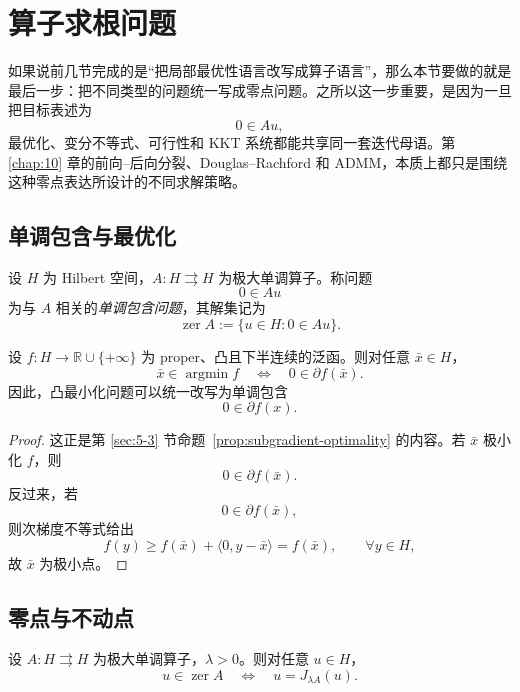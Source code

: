 \section{算子求根问题}

\label{sec:9-4}

如果说前几节完成的是“把局部最优性语言改写成算子语言”，那么本节要做的就是最后一步：把不同类型的问题统一写成零点问题。之所以这一步重要，是因为一旦把目标表述为
\[
0\in Au,
\]
最优化、变分不等式、可行性和 KKT 系统都能共享同一套迭代母语。第 \ref{chap:10} 章的前向--后向分裂、Douglas--Rachford 和 ADMM，本质上都只是围绕这种零点表达所设计的不同求解策略。

\subsection{单调包含与最优化}

\begin{definition}[单调包含问题]\label{def:monotone-inclusion-problem}
设 $H$ 为 Hilbert 空间，$A\colon H\rightrightarrows H$ 为极大单调算子。称问题
\[
0\in Au
\]
为与 $A$ 相关的\emph{单调包含问题}，其解集记为
\[
\operatorname{zer} A:=\{u\in H:0\in Au\}.
\]
\end{definition}

\begin{proposition}[最优化问题是单调包含的特例]\label{prop:optimization-as-monotone-inclusion}
设 $f\colon H\to \mathbb R\cup\{+\infty\}$ 为 proper、凸且下半连续的泛函。则对任意 $\bar x\in H$，
\[
\bar x\in \operatorname*{argmin} f
\quad\Longleftrightarrow\quad
0\in \partial f(\bar x).
\]
因此，凸最小化问题可以统一改写为单调包含
\[
0\in \partial f(x).
\]
\end{proposition}

\begin{proof}
这正是第 \ref{sec:5-3} 节命题~\ref{prop:subgradient-optimality} 的内容。若 $\bar x$ 极小化 $f$，则
\[
0\in \partial f(\bar x).
\]
反过来，若
\[
0\in \partial f(\bar x),
\]
则次梯度不等式给出
\[
f(y)\ge f(\bar x)+\langle 0,y-\bar x\rangle=f(\bar x),\qquad \forall y\in H,
\]
故 $\bar x$ 为极小点。
\end{proof}

\subsection{零点与不动点}

\begin{proposition}\label{prop:resolvent-fixed-point-equivalence}
设 $A\colon H\rightrightarrows H$ 为极大单调算子，$\lambda>0$。则对任意 $u\in H$，
\[
u\in \operatorname{zer} A
\quad\Longleftrightarrow\quad
u=J_{\lambda A}(u).
\]
\end{proposition}

